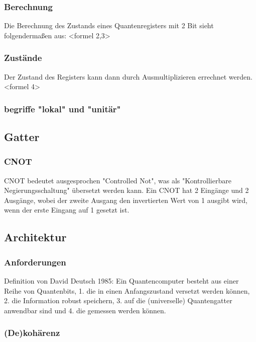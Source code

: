 \subsubsection{Berechnung}

Die Berechnung des Zustands eines Quantenregisters mit 2 Bit sieht folgendermaßen aus:
<formel 2,3>

\subsubsection{Zust\"ande}

Der Zustand des Registers kann dann durch Ausmultiplizieren errechnet werden. <formel 4>

\subsubsection{begriffe "lokal" und "unit\"ar"}

\subsection{Gatter}
\label{sec:Gatter}

\subsubsection{CNOT}

CNOT bedeutet ausgesprochen "Controlled Not", was als "Kontrollierbare Negierungsschaltung" \"ubersetzt werden kann.
Ein CNOT hat 2 Eing\"ange und 2 Ausg\"ange, wobei der zweite Ausgang den invertierten Wert von 1 ausgibt wird, wenn der erste Eingang auf 1 gesetzt ist.

\subsection{Architektur}
\label{sec:Architektur}

\subsubsection{Anforderungen}

Definition von David Deutsch 1985:
Ein Quantencomputer besteht aus einer Reihe von Quantenbits,
1. die in einen Anfangszustand versetzt werden k\"onnen,
2. die Information robust speichern,
3. auf die (universelle) Quantengatter anwendbar sind und
4. die gemessen werden k\"onnen.

\subsubsection{(De)koh\"arenz}

